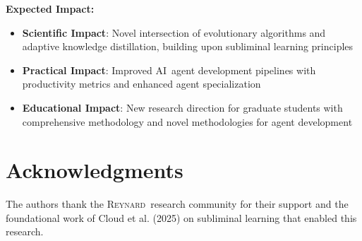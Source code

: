 \documentclass[10pt]{article}
\theoremstyle{definition}
\newcommand{\reynard}{\textsc{Reynard}}
\newcommand{\ai}{\textsc{AI}}
\begin{document}
\textbf{Expected Impact:}

\begin{itemize}
    \item \textbf{Scientific Impact}: Novel intersection of evolutionary algorithms and adaptive knowledge distillation, building upon subliminal learning principles
    \item \textbf{Practical Impact}: Improved \ai\ agent development pipelines with productivity metrics and enhanced agent specialization
    \item \textbf{Educational Impact}: New research direction for graduate students with comprehensive methodology and novel methodologies for agent development
\end{itemize}

\section*{Acknowledgments}

The authors thank the \reynard\ research community for their support and the foundational work of Cloud et al. (2025) on subliminal learning that enabled this research.



\end{document}
